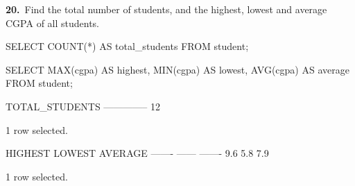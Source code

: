 \noindent\begin{minipage}{\linewidth}
\begingroup{}
{\fontsize{14}{17}\selectfont\textbf{20.}}\ Find the total number of students, and the highest, lowest and average CGPA of all students.\par
\endgroup\vspace{12pt}


\begin{sqlcode}
SELECT COUNT(*) AS total_students FROM student;

SELECT MAX(cgpa) AS highest, MIN(cgpa) AS lowest,
       AVG(cgpa) AS average
FROM student;
\end{sqlcode}

\vspace{18pt}


\begin{sqlout}[fontsize=\small]
TOTAL_STUDENTS
--------------
            12

1 row selected.

HIGHEST  LOWEST  AVERAGE
-------  ------  -------
    9.6     5.8      7.9

1 row selected.
\end{sqlout}
\end{minipage}\par\vspace{24pt}

